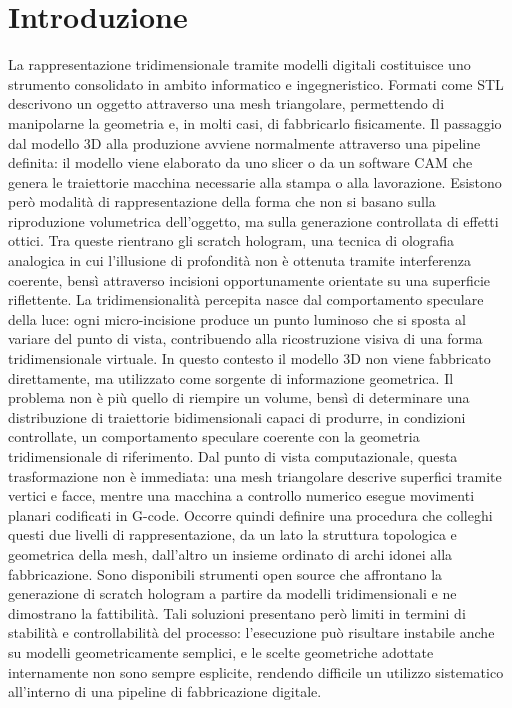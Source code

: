 \documentclass[a4paper,11pt,titlepage,twoside]{book}
\newcommand{\1}{\mathbf{1}}
\numberwithin{equation}{chapter}
\theoremstyle{plain}
\theoremstyle{definition}
\begin{document}
	\clearpage
	
	\tableofcontents
	\clearpage
	
	\mainmatter
	
	
	\chapter{Introduzione}
	
	La rappresentazione tridimensionale tramite modelli digitali costituisce
	uno strumento consolidato in ambito informatico e ingegneristico. Formati
	come STL descrivono un oggetto attraverso una mesh triangolare, permettendo
	di manipolarne la geometria e, in molti casi, di fabbricarlo fisicamente.
	Il passaggio dal modello 3D alla produzione avviene normalmente attraverso
	una pipeline definita: il modello viene elaborato da uno slicer o da un
	software CAM che genera le traiettorie macchina necessarie alla stampa o
	alla lavorazione.
	Esistono però modalità di rappresentazione della forma che non si basano
	sulla riproduzione volumetrica dell'oggetto, ma sulla generazione
	controllata di effetti ottici. Tra queste rientrano gli scratch hologram,
	una tecnica di olografia analogica in cui l'illusione di profondità non è
	ottenuta tramite interferenza coerente, bensì attraverso incisioni
	opportunamente orientate su una superficie riflettente. La tridimensionalità
	percepita nasce dal comportamento speculare della luce: ogni micro-incisione
	produce un punto luminoso che si sposta al variare del punto di vista,
	contribuendo alla ricostruzione visiva di una forma tridimensionale virtuale.
	In questo contesto il modello 3D non viene fabbricato direttamente, ma
	utilizzato come sorgente di informazione geometrica. Il problema non è più
	quello di riempire un volume, bensì di determinare una distribuzione di
	traiettorie bidimensionali capaci di produrre, in condizioni controllate,
	un comportamento speculare coerente con la geometria tridimensionale di
	riferimento. Dal punto di vista computazionale, questa trasformazione non
	è immediata: una mesh triangolare descrive superfici tramite vertici e
	facce, mentre una macchina a controllo numerico esegue movimenti planari
	codificati in G-code. Occorre quindi definire una procedura che colleghi
	questi due livelli di rappresentazione, da un lato la struttura topologica
	e geometrica della mesh, dall'altro un insieme ordinato di archi idonei
	alla fabbricazione.
	Sono disponibili strumenti open source che affrontano la generazione di
	scratch hologram a partire da modelli tridimensionali e ne dimostrano la
	fattibilità. Tali soluzioni presentano però limiti in termini di stabilità
	e controllabilità del processo: l'esecuzione può risultare instabile anche
	su modelli geometricamente semplici, e le scelte geometriche adottate
	internamente non sono sempre esplicite, rendendo difficile un utilizzo
	sistematico all'interno di una pipeline di fabbricazione digitale.
	
\end{document}
